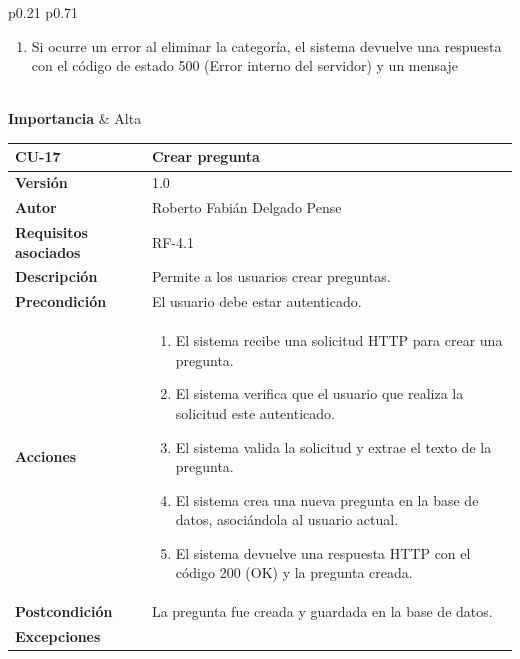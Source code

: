 \begin{table}[p]
\begin{tabularx}{\linewidth}{ p{0.21\columnwidth} p{0.71\columnwidth} }
\begin{enumerate}
                \item Si ocurre un error al eliminar la categoría, el sistema devuelve una respuesta con el código de estado 500 (Error interno del servidor) y un mensaje
            \end{enumerate}\\
		\textbf{Importancia}          & Alta \\
		\bottomrule
	\end{tabularx}
	\caption{CU-16 Eliminar una categoría.}
\end{table}

\begin{table}[p]
	\centering
	\begin{tabularx}{\linewidth}{ p{} p{} }
		\toprule
		\textbf{CU-17}    & \textbf{Crear pregunta}\\
		\toprule
		\textbf{Versión}              & 1.0    \\
		\textbf{Autor}                & Roberto Fabián Delgado Pense \\
		\textbf{Requisitos asociados} & RF-4.1 \\ 
		\textbf{Descripción}          & Permite a los usuarios crear preguntas. \\
		\textbf{Precondición}         & El usuario debe estar autenticado.\\
		\textbf{Acciones}             &
		\begin{enumerate}
			\def\labelenumi{\arabic{enumi}.}
			\tightlist
			\item El sistema recibe una solicitud HTTP para crear una pregunta.
                \item El sistema verifica que el usuario que realiza la solicitud este autenticado.
			\item El sistema valida la solicitud y extrae el texto de la pregunta.
                \item El sistema crea una nueva pregunta en la base de datos, asociándola al usuario actual.
                \item El sistema devuelve una respuesta HTTP con el código 200 (OK) y la pregunta creada.            \end{enumerate}\\
		\textbf{Postcondición}        & La pregunta fue creada y guardada en la base de datos.\\
		\textbf{Excepciones}          & 
            \begin{enumerate}
			\def\labelenumi{\arabic{enumi}.}

\end{enumerate}
\end{tabularx}
\end{table}
